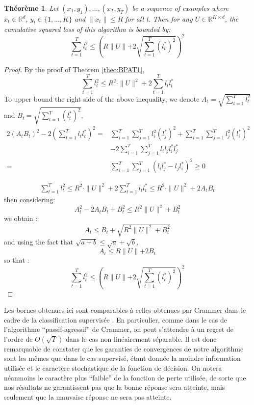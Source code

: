 \documentclass[twocolumn]{article}
\newtheorem{theorem}{Théorème}
\begin{document}
\begin{theorem}
	\label{theo:BPAT2}
	Let $(x_1,y_1),...,(x_T,y_T) $ be a sequence of examples where  $x_t\in \mathbb{R}^d$, $y_t \in \{1,...,K\}$ and $\parallel{x_t}\parallel \leqslant R$ for all t. Then for any  $U \in \mathbb{R}^{K\times d}$, the cumulative squared loss of this algorithm is bounded by:
	\[\sum_{t=1}^{T}l_t^2 \leqslant \left(R\parallel{U}\parallel+2 \sqrt{\sum_{t=1}^{T}(l_t^{\ast})^2}\right)^2 \]
\end{theorem}
\begin{proof}
	By the proof of Theorem \ref{theo:BPAT1}, 
	\[\sum_{t=1}^{T}l_t^2 \leqslant R^2\cdot \parallel{U}\parallel^2 + 2\sum_{t=1}^{T}l_t l_t^{\ast}\]
	To upper bound the right side of the above inequality, we denote $A_t = \sqrt{\sum_{t=1}^{T}l_t^2}$ and $B_t = \sqrt{\sum_{t=1}^{T}(l_t^{\ast})^2}$, 
	\begin{align}
	2(A_tB_t)^2-2(\sum_{t=1}^{T}l_tl_t^{\ast})^2 =& \sum_{i=1}^{T}\sum_{j=1}^{T}l_i^2(l_j^{\ast})^2+\sum_{i=1}^{T}\sum_{j=1}^{T}l_j^2(l_i^{\ast})^2 \nonumber\\
	&- 2\sum_{i=1}^{T}\sum_{j=1}^{T}l_il_jl_i^{\ast}l_j^{\ast}\nonumber\\
	=& \sum_{i=1}^{T}\sum_{j=1}^{T}(l_il_j^{\ast}-l_jl_i^{\ast})^2 \geqslant 0 \nonumber
	\end{align}
	
	\begin{align}
	\sum_{t=1}^{T}l_t^2 \leqslant R^2 \cdot \parallel{U}\parallel^2+2\sum_{t=1}^{T}l_tl_t^{\ast}\leqslant R^2 \cdot \parallel{U}\parallel^2+2A_tB_t\nonumber
	\end{align}
	then considering:
	\[A_t^2 -2 A_tB_t+B_t^2\leqslant R^2\parallel{U}\parallel^2+B_t^2\]
	we obtain :
	\[A_t \leqslant B_t+\sqrt{R^2\parallel{U}\parallel^2+B_t^2}\]
	and using the fact that $\sqrt{a+b}\leqslant \sqrt{a}+\sqrt{b}$,
	\[A_t \leqslant R\parallel{U}\parallel+2 B_t\]
	so that :
	\[\sum_{t=1}^{T}l_t^2 \leqslant \left(R\parallel{U}\parallel+2 \sqrt{\sum_{t=1}^{T}(l_t^{\ast})^2}\right)^2 \]
\end{proof}


Les bornes obtenues ici sont comparables  à celles obtenues par Crammer dans le cadre de la classification supervisée  \cite{crammer2006online}. En particulier, comme dans le cas de l'algorithme ``passif-agressif'' de Crammer, on peut s'attendre à un regret de l'ordre de $O(\sqrt{T})$ dans le cas non-linéairement séparable. Il est donc remarquable de constater que les garanties de convergences de notre algorithme sont les mêmes que dans le cas supervisé, étant donnée la moindre information utilisée et le caractère stochastique de la fonction de décision. On notera néanmoins le caractère plus ``faible'' de la fonction de perte utilisée, de sorte que nos résultats ne garantissent pas que la bonne réponse sera atteinte, mais seulement que la mauvaise réponse ne sera pas atteinte.
\end{document}
